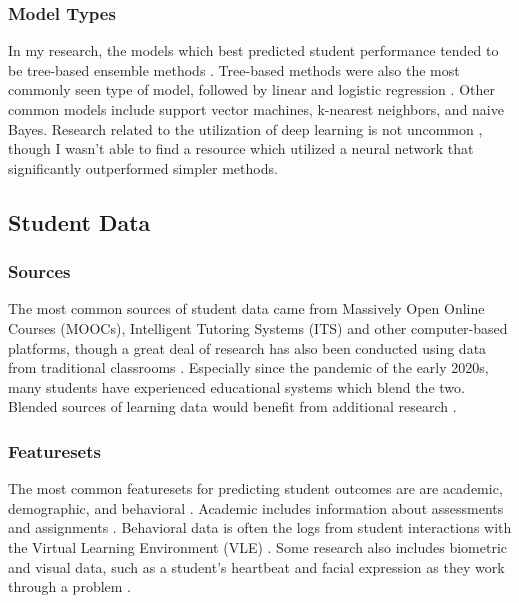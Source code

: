 \documentclass{article}
\begin{document}
        \subsubsection{Model Types}
            In my research, the models which best predicted student performance tended to be tree-based ensemble methods \cite{explore2021,engage2014,assign2021esteban}.
            Tree-based methods were also the most commonly seen type of model, followed by linear and logistic regression \cite{assign2021esteban}.
            Other common models include support vector machines, k-nearest neighbors, and naive Bayes.
            Research related to the utilization of deep learning is not uncommon \cite{explore2021,assign2021esteban}, though I wasn't able to find a resource which utilized a neural network that significantly outperformed simpler methods.

    \subsection{Student Data}
        \subsubsection{Sources}
            The most common sources of student data came from Massively Open Online Courses (MOOCs), Intelligent Tutoring Systems (ITS) and other computer-based platforms,
            though a great deal of research has also been conducted using data from traditional classrooms \cite{educate2019,early2021,assign2021esteban,explore2015}.
            Especially since the pandemic of the early 2020s, many students have experienced educational systems which blend the two.
            Blended sources of learning data would benefit from additional research \cite{educate2019,early2021}.

        \subsubsection{Featuresets}
            The most common featuresets for predicting student outcomes are are academic, demographic, and behavioral \cite{engage2014,eval2018,early2019,assign2021esteban,compare2015}.
            Academic includes information about assessments and assignments \cite{assign2021esteban}.
            Behavioral data is often the logs from student interactions with the Virtual Learning Environment (VLE) \cite{early2019,assign2021esteban}.
            Some research also includes biometric and visual data, such as a student's heartbeat and facial expression as they work through a problem \cite{assign2021chango}.
\end{document}
